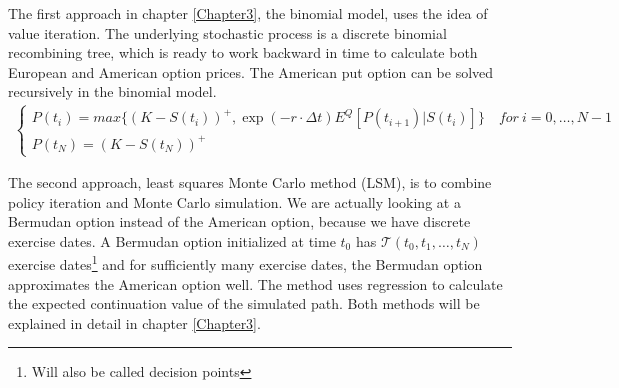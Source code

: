 The first approach in chapter \ref{Chapter3}, the binomial model, uses the idea of value iteration. The underlying stochastic process is a discrete binomial recombining tree, which is ready to work backward in time to calculate both European and American option prices. The American put option can be solved recursively in the binomial model.
\begin{equation*}\label{BellmanEq}
\begin{split}
\begin{cases}
          P(t_i) = max\{ (K-S(t_i))^+, \exp(-r\cdot \Delta t) E^Q[P(t_{i+1})|S(t_i)]\} \quad for \ i={0,\ldots,N-1} \\
          P(t_N) = (K-S(t_N))^+ 
\end{cases}
\end{split}
\end{equation*}

The second approach, least squares Monte Carlo method (LSM), is to combine policy iteration and Monte Carlo simulation. We are actually looking at a Bermudan option instead of the American option, because we have discrete exercise dates. A Bermudan option initialized at time $t_0$ has $\mathcal{T}(t_0,t_1,\ldots,t_N)$ exercise dates\footnote{Will also be called decision points} and for sufficiently many exercise dates, the Bermudan option approximates the American option well. The method uses regression to calculate the expected continuation value of the simulated path. Both methods will be explained in detail in chapter \ref{Chapter3}.





